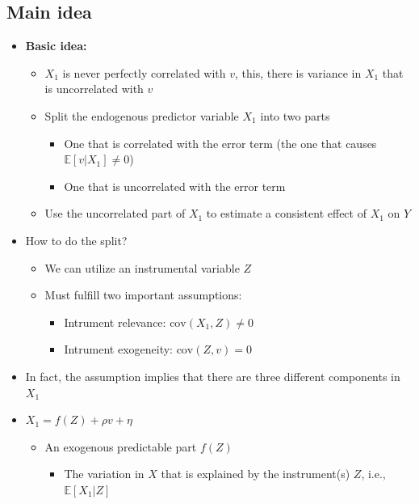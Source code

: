 \documentclass[10pt]{article}
\begin{document}
\subsection{Main idea}
\begin{itemize}
    \item \textbf{Basic idea:}
    \begin{itemize}
        \item $X_1 $ is never perfectly correlated with $ v $, this, there is variance in $X_1 $ that is uncorrelated with $v $
        \item Split the endogenous predictor variable $X_1 $ into two parts 
        \begin{itemize}
            \item One that is correlated with the error term (the one that causes $\mathbb{E}[v|X_1] \neq 0 $)
            \item One that is uncorrelated with the error term 
        \end{itemize}
        \item Use the uncorrelated part of $X_1 $ to estimate a consistent effect of $X_1 \text{ on } Y $
    \end{itemize}
    \item How to do the split?
    \begin{itemize}
        \item We can utilize an instrumental variable $Z $
        \item Must fulfill two important assumptions: 
        \begin{itemize}
            \item Intrument relevance: $\text{cov}(X_1, Z)\neq 0 $
            \item Intrument exogeneity: $\text{cov}(Z, v)  = 0 $
        \end{itemize}
    \end{itemize}
    \item In fact, the assumption implies that there are three different components in $X_1 $
    \item $X_1 = f(Z) + \rho v + \eta $
    \begin{itemize}
        \item An exogenous predictable part $f(Z)$
        \begin{itemize}
            \item The variation in $X $ that is explained by the instrument(s) $Z $, i.e., $\mathbb{E}[X_1|Z] $
        \end{itemize}

\end{itemize}
\end{itemize}
\end{document}
